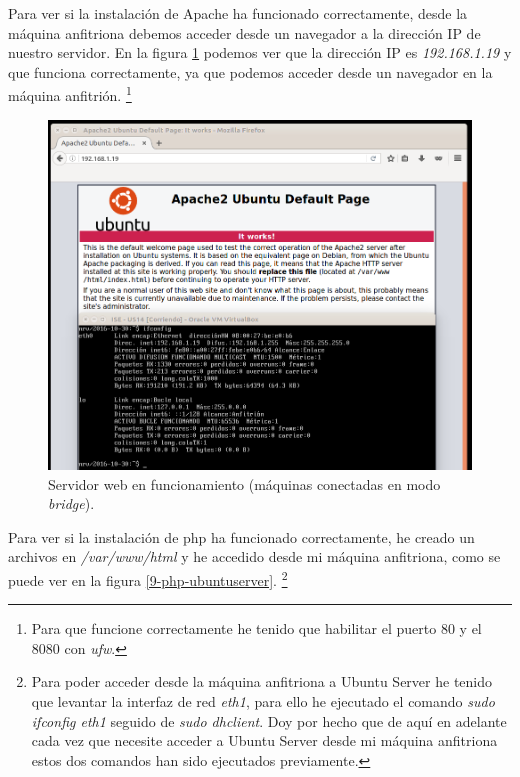\documentclass[a4paper,titlepage,12pt]{scrartcl}	%
\numberwithin{figure}{section} %
\numberwithin{table}{section} %
\begin{document}
	Para ver si la instalación de Apache ha funcionado correctamente, desde la máquina anfitriona debemos acceder desde un navegador a la dirección IP de nuestro servidor. En la figura \ref{9-web-ubuntu} podemos ver que la dirección IP es \textit{192.168.1.19} y que funciona correctamente, ya que podemos acceder desde un navegador en la máquina anfitrión. \footnote{Para que funcione correctamente he tenido que habilitar el puerto 80 y el 8080 con \textit{ufw}.}
	
	\begin{figure}[H]
		\includegraphics[width=\linewidth]{./Imagenes/9-web-ubuntu.png}
		\vspace{-0.5cm}
		\caption[Servidor web en funcionamiento (máquinas conectadas en modo \textit{bridge}).]{Servidor web en funcionamiento (máquinas conectadas en modo \textit{bridge}).}
		\label{9-web-ubuntu}
	\end{figure}
	
	Para ver si la instalación de php ha funcionado correctamente, he creado un archivos en \textit{/var/www/html} y he accedido desde mi máquina anfitriona, como se puede ver en la figura \ref{9-php-ubuntuserver}. \footnote{Para poder acceder desde la máquina anfitriona a Ubuntu Server he tenido que levantar la interfaz de red \textit{eth1}, para ello he ejecutado el comando \textit{sudo ifconfig eth1} seguido de \textit{sudo dhclient}. Doy por hecho que de aquí en adelante cada vez que necesite acceder a Ubuntu Server desde mi máquina anfitriona estos dos comandos han sido ejecutados previamente.}
	
\end{document}

